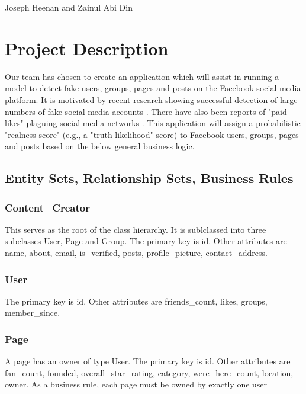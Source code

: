 \documentclass{article}
\begin{document}
\begin{center}
\begin{LARGE}{Joseph Heenan and Zainul Abi Din} \end{LARGE}
\end{center}

\section{Project Description}

Our team has chosen to create an application which will assist in running a model to detect fake users, groups, pages and posts on the Facebook social media platform. It is motivated by recent research showing successful detection of large numbers of fake social media accounts \cite{2017arXiv170102405E}. There have also been reports of "paid likes"  plaguing social media networks \cite{TheBotBubble}. This application will assign a probabilistic "realness score" (e.g., a "truth likelihood" score) to Facebook users, groups, pages and posts based on the below general business logic.

\subsection{Entity Sets, Relationship Sets, Business Rules}

\subsubsection{Content_Creator}
This serves as the root of the class hierarchy. It is sublclassed into three subclasses User, Page and Group. The primary key is id. Other attributes are name, about, email, is_verified, posts, profile_picture, contact_address.


\subsubsection{User}

The primary key is id. Other attributes are friends_count, likes, groups, member_since.

\subsubsection{Page}
A page has an owner of type User. The primary key is id. Other attributes are fan_count, founded, overall_star_rating, category, were_here_count, location, owner.  As a business rule, each page must be owned by exactly one user
\end{document}
